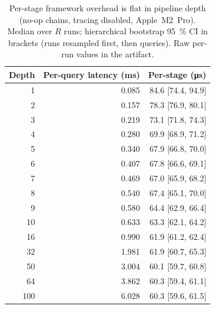\begin{table}[t]
\centering
\caption{Per-stage framework overhead is flat in pipeline depth (no-op chains, tracing disabled, Apple~M2~Pro). Median over $R$ runs; hierarchical bootstrap \SI{95}{\percent} CI in brackets (runs resampled first, then queries). Raw per-run values in the artifact.}
\label{tab:noop-depth}
\begin{tabular}{rrr}
\toprule
Depth & Per-query latency (\si{\milli\second}) & Per-stage (\si{\micro\second}) \\
\midrule
1 & 0.085 & 84.6 [74.4, 94.9] \\
2 & 0.157 & 78.3 [76.9, 80.1] \\
3 & 0.219 & 73.1 [71.8, 74.3] \\
4 & 0.280 & 69.9 [68.9, 71.2] \\
5 & 0.340 & 67.9 [66.8, 70.0] \\
6 & 0.407 & 67.8 [66.6, 69.1] \\
7 & 0.469 & 67.0 [65.9, 68.2] \\
8 & 0.540 & 67.4 [65.1, 70.0] \\
9 & 0.580 & 64.4 [62.9, 66.4] \\
10 & 0.633 & 63.3 [62.1, 64.2] \\
16 & 0.990 & 61.9 [61.2, 62.4] \\
32 & 1.981 & 61.9 [60.7, 65.3] \\
50 & 3.004 & 60.1 [59.7, 60.8] \\
64 & 3.862 & 60.3 [59.4, 61.1] \\
100 & 6.028 & 60.3 [59.6, 61.5] \\
\bottomrule
\end{tabular}
\end{table}

